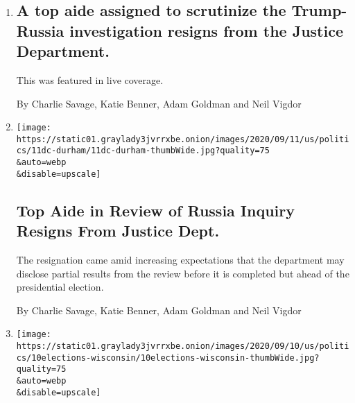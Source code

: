 \begin{enumerate}
\def\labelenumi{\arabic{enumi}.}
\item
  \href{/live/2020/09/11/us/trump-vs-biden/a-top-aide-assigned-to-scrutinize-the-trump-russia-investigation-resigns-from-the-justice-department}{}

  \hypertarget{a-top-aide-assigned-to-scrutinize-the-trump-russia-investigation-resigns-from-the-justice-department}{%
  \subsection{A top aide assigned to scrutinize the Trump-Russia
  investigation resigns from the Justice
  Department.}\label{a-top-aide-assigned-to-scrutinize-the-trump-russia-investigation-resigns-from-the-justice-department}}

  This was featured in live coverage.

  By Charlie Savage, Katie Benner, Adam Goldman and Neil Vigdor
\item
  \href{/2020/09/11/us/politics/nora-dannehy-durham-russia-investigation.html}{}

  \texttt{[image: https://static01.graylady3jvrrxbe.onion/images/2020/09/11/us/politics/11dc-durham/11dc-durham-thumbWide.jpg?quality=75\\\&auto=webp\\\&disable=upscale]}

  \hypertarget{top-aide-in-review-of-russia-inquiry-resigns-from-justice-dept}{%
  \subsection{Top Aide in Review of Russia Inquiry Resigns From Justice
  Dept.}\label{top-aide-in-review-of-russia-inquiry-resigns-from-justice-dept}}

  The resignation came amid increasing expectations that the department
  may disclose partial results from the review before it is completed
  but ahead of the presidential election.

  By Charlie Savage, Katie Benner, Adam Goldman and Neil Vigdor
\item
  \href{/live/2020/09/10/us/trump-vs-biden/wisconsins-supreme-court-temporarily-suspends-the-mailing-of-absentee-ballots}{}

  \texttt{[image: https://static01.graylady3jvrrxbe.onion/images/2020/09/10/us/politics/10elections-wisconsin/10elections-wisconsin-thumbWide.jpg?quality=75\\\&auto=webp\\\&disable=upscale]}

  \hypertarget{wisconsins-supreme-court-temporarily-suspends-the-mailing-of-absentee-ballots}{%
}
\end{enumerate}

